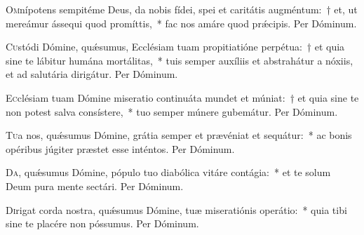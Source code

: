 \documentclass[vesperale_romanum.tex]{subfiles}
\begin{document}


\oratio

\lettrine{O}{m}nípotens sempitéme Deus, da nobis fídei, spei et caritátis augméntum:~† et, ut mereámur ássequi quod promíttis,~* fac nos amáre quod prǽcipis. Per Dóminum.



\oratio

\lettrine{C}{u}stódi Dómine, quǽsumus, Ecclésiam tuam propitiatióne perpétua:~† et quia sine te lábitur humána mortálitas,~* tuis semper auxíliis et abstrahátur a nóxiis, et ad salutária dirigátur. Per Dóminum. 



\oratio

\lettrine{E}{c}clésiam tuam Dómine miseratio continuáta mundet et múniat:~† et quia sine te non potest salva consístere,~* tuo semper múnere gubemátur. Per Dóminum.



\oratio

\lettrine{T}{u}a nos, quǽsumus Dómine, grátia semper et prævéniat et sequátur:~* ac bonis opéribus júgiter præstet esse inténtos.
Per Dóminum.


\oratio

\lettrine{D}{a}, quǽsumus Dómine, pópulo tuo diabólica vitáre contágia:~* et te solum Deum pura mente se\-ctári. Per Dóminum.



\oratio

\lettrine{D}{i}rigat corda nostra, quǽsumus Dómine, tuæ miseratiónis operátio:~* quia tibi sine te placére non póssumus. Per Dóminum.
\end{document}
